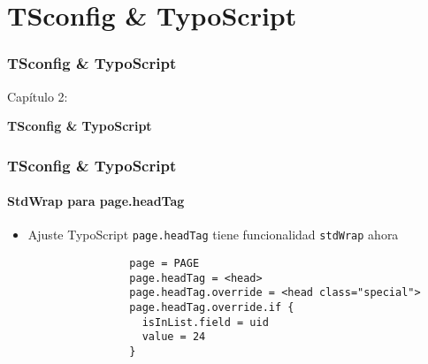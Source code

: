 %

\section{TSconfig \& TypoScript}
\begin{frame}[fragile]
	\frametitle{TSconfig \& TypoScript}

	\begin{center}\huge{Capítulo 2:}\end{center}
	\begin{center}\huge{\color{typo3darkgrey}\textbf{TSconfig \& TypoScript}}\end{center}

\end{frame}


\begin{frame}[fragile]
	\frametitle{TSconfig \& TypoScript}
	\framesubtitle{StdWrap para page.headTag}

	\begin{itemize}
		\item Ajuste TypoScript \texttt{page.headTag} tiene funcionalidad \texttt{stdWrap} ahora

			\begin{lstlisting}
				page = PAGE
				page.headTag = <head>
				page.headTag.override = <head class="special">
				page.headTag.override.if {
		  		  isInList.field = uid
		  		  value = 24
				}
			\end{lstlisting}	

	\end{itemize}

\end{frame}

